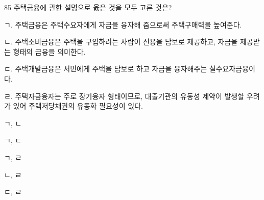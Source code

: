 \begin{question}{85}
주택금융에 관한 설명으로 옳은 것을 모두 고른 것은?
\begin{framedtext}
ㄱ. 주택금융은 주택수요자에게 자금을 융자해 줌으로써 주택구매력을 높여준다. \par
ㄴ. 주택소비금융은 주택을 구입하려는 사람이 신용을 담보로 제공하고, 자금을 제공받는 형태의 금융을 의미한다. \par
ㄷ. 주택개발금융은 서민에게 주택을 담보로 하고 자금을 융자해주는 실수요자금융이다. \par
ㄹ. 주택자금융자는 주로 장기융자 형태이므로, 대출기관의 유동성 제약이 발생할 우려가 있어 주택저당채권의 유동화 필요성이 있다.
\end{framedtext}
\begin{choices}
  \item ㄱ, ㄴ
  \item ㄱ, ㄷ
  \item ㄱ, ㄹ
  \item ㄴ, ㄹ
  \item ㄷ, ㄹ
\end{choices}
\end{question}
